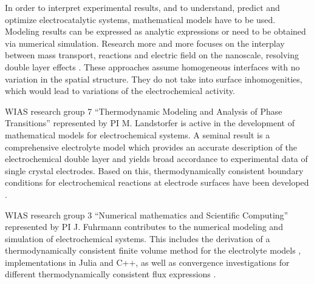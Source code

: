 \documentclass[a4paper,10pt]{article}
\begin{document}

In order to interpret experimental results, and to understand, predict and optimize electrocatalytic systems, mathematical models have to be used.
Modeling results can be expressed as analytic expressions or need to be obtained via numerical simulation.
Research more and more focuses on the interplay between mass transport, reactions and  electric field on the nanoscale, resolving double layer effects \cite{lin2019understanding,tan2018double,eden2019modeling,bohra2019modeling}.
%
These approaches assume homogeneous interfaces with no variation in the spatial structure. They do not take into surface inhomogenities, which would lead to variations of the electrochemical activity.


WIAS research group 7 ``Thermodynamic Modeling and Analysis of Phase Transitions'' represented by PI M. Landstorfer is active in the development of mathematical models for electrochemical systems.  A seminal result is a comprehensive electrolyte model which provides an accurate description of the electrochemical double layer and yields broad accordance to experimental data of single crystal electrodes. Based on this, thermodynamically consistent boundary conditions for electrochemical reactions at electrode surfaces have been developed \cite{DGM2013,DGL2014,Landstorfer2016187,landstorfer2017boundary}.

WIAS research group 3 ``Numerical mathematics and Scientific Computing'' represented by PI J. Fuhrmann contributes to the numerical modeling and simulation of electrochemical systems. This includes  the derivation of a thermodynamically consistent finite volume method \cite{JF2016} for the electrolyte models \cite{DGL2014,VagnerEtAl2019}, implementations in Julia and C++, as well as convergence investigations for  different thermodynamically consistent flux expressions \cite{CCFG2020}.   %
\end{document}
